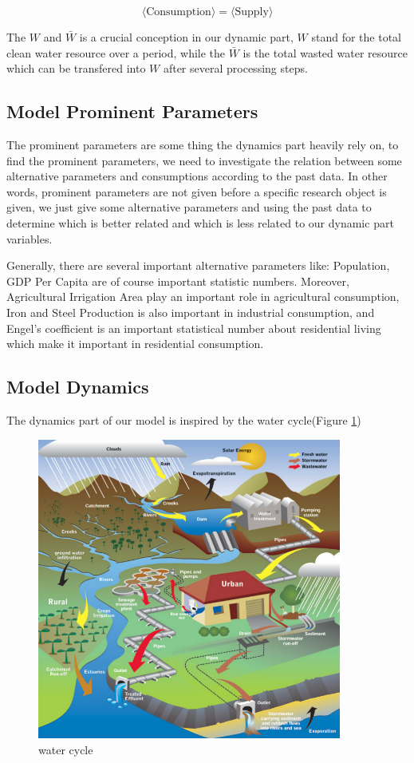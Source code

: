     $$
    \langle \text{Consumption}\rangle = \langle \text{Supply} \rangle
    $$

    The $W$ and $\bar{W}$ is a crucial conception in our dynamic part, $W$ stand for the total clean water resource over a period, while the $\bar{W}$ is the total wasted water resource which can be transfered into $W$ after several processing steps.

  \subsection{Model Prominent Parameters}

    The prominent parameters are some thing the dynamics part heavily rely on, to find the prominent parameters, we need to investigate the relation between some alternative parameters and consumptions according to the past data. In other words, prominent parameters are not given before a specific research object is given, we just give some alternative parameters and using the past data to determine which is better related and which is less related to our dynamic part variables.

    Generally, there are several important alternative parameters like: Population, GDP Per Capita are of course important statistic numbers. Moreover, Agricultural Irrigation Area play an important role in agricultural consumption, Iron and Steel Production is also important in industrial consumption, and Engel's coefficient is an important statistical number about residential living which make it important in residential consumption.

  \subsection{Model Dynamics}

    The dynamics part of our model is inspired by the water cycle(Figure \ref{water cycle})\cite{WaterCycle}
    \begin{figure}[!hb]
    \begin{center}
    \includegraphics[width = 10cm]{picture/UrbanWaterCycle.jpg}
    \caption{water cycle}
    \label{water cycle}
    \end{center}
    \end{figure}


